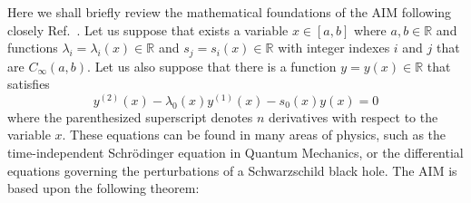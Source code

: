 Here we shall briefly review the mathematical foundations of the \ac{AIM} following closely Ref.~\cite{aim_original}. Let us suppose that exists a variable $x \in [a,b]$ where $a,b \in \mathbb{R}$ and functions $\lambda_i = \lambda_i(x) \in \mathbb{R}$ and $s_j = s_i(x) \in \mathbb{R}$ with integer indexes $i$ and $j$ that are $C_\infty(a,b)$. Let us also suppose that there is a function $y=y(x)\in\mathbb{R}$ that satisfies
%
\begin{equation}
  y^{(2)}(x) - \lambda_0(x) y^{(1)}(x) - s_0(x)y(x) = 0
  \label{eq:aim_general_ode}
\end{equation}
%
where the parenthesized superscript denotes $n$ derivatives with respect to the variable $x$. These equations can be found in many areas of physics, such as the time-independent Schr\"odinger equation in Quantum Mechanics, or the differential equations governing the perturbations of a Schwarzschild black hole. The \ac{AIM} is based upon the following theorem:

